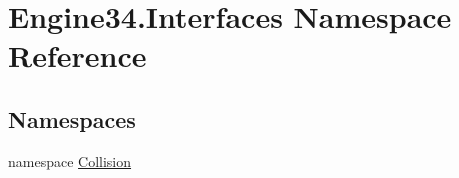 \hypertarget{a00258}{}\section{Engine34.\+Interfaces Namespace Reference}
\label{a00258}
\subsection*{Namespaces}
\begin{DoxyCompactItemize}
\item 
namespace \hyperlink{a00256}{Collision}
\end{DoxyCompactItemize}
